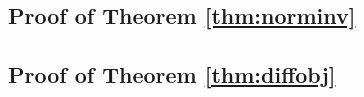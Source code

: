 

\subsection{Proof of Theorem \ref{thm:norminv}}




\subsection{Proof of Theorem \ref{thm:diffobj}}



